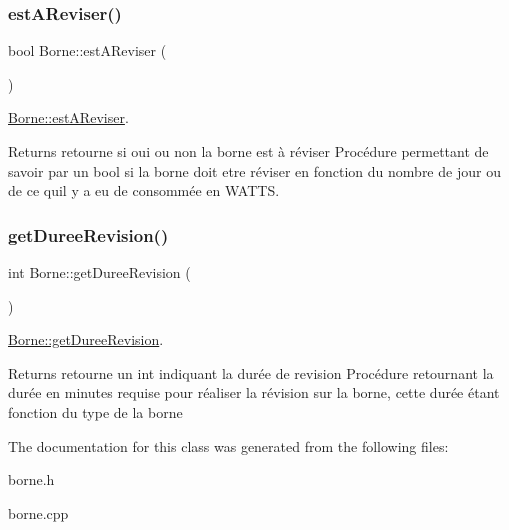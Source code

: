 \subsubsection{\texorpdfstring{est\+A\+Reviser()}{estAReviser()}}
{\footnotesize\ttfamily bool Borne\+::est\+A\+Reviser (\begin{DoxyParamCaption}{ }\end{DoxyParamCaption})}



\hyperlink{class_borne_a40c1a1a990a10b8bc1421a1a39b7300a}{Borne\+::est\+A\+Reviser}. 

\begin{DoxyReturn}{Returns}
retourne si oui ou non la borne est à réviser Procédure permettant de savoir par un bool si la borne doit etre réviser en fonction du nombre de jour ou de ce qu\textquotesingle{}il y a eu de consommée en W\+A\+T\+TS. 
\end{DoxyReturn}
\mbox{\label{class_borne_aba8f90c81ef4efbe239e67e12015bb44}} 
\subsubsection{\texorpdfstring{get\+Duree\+Revision()}{getDureeRevision()}}
{\footnotesize\ttfamily int Borne\+::get\+Duree\+Revision (\begin{DoxyParamCaption}{ }\end{DoxyParamCaption})}



\hyperlink{class_borne_aba8f90c81ef4efbe239e67e12015bb44}{Borne\+::get\+Duree\+Revision}. 

\begin{DoxyReturn}{Returns}
retourne un int indiquant la durée de revision Procédure retournant la durée en minutes requise pour réaliser la révision sur la borne, cette durée étant fonction du type de la borne 
\end{DoxyReturn}


The documentation for this class was generated from the following files\+:\begin{DoxyCompactItemize}
\item 
borne.\+h\item 
borne.\+cpp\end{DoxyCompactItemize}
